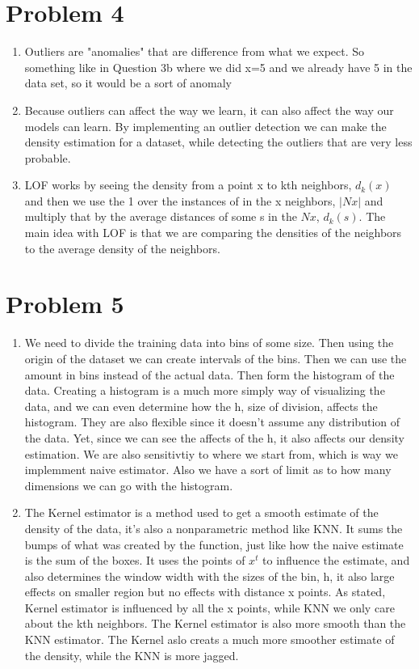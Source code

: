 \documentclass{article}
\begin{document}
\section*{Problem 4}
\begin{enumerate}[label=(\alph*)]
    \item Outliers are "anomalies" that are difference from what we expect. So something like in 
    Question 3b where we did x=5 and we already have 5 in the data set, so it would be a sort of anomaly
    \item Because outliers can affect the way we learn, it can also affect the way our models can learn. By implementing an outlier detection 
    we can make the density estimation for a dataset, while detecting the outliers that are very less probable. 
    \item LOF works by seeing the density from a point x to kth neighbors, $d_{k}(x)$ and then we use the 1 over the instances of in the x neighbors, $|N{x}|$ and multiply that by the average distances of some s in the $N{x}$, $d_{k}(s)$.
    The main idea with LOF is that we are comparing the densities of the neighbors to the average density of the neighbors.
\end{enumerate}
\section*{Problem 5}
\begin{enumerate}[label=(\alph*)]
    \item We need to divide the training data into bins of some size. Then using the origin of the dataset we can create intervals of the bins.
    Then we can use the amount in bins instead of the actual data. Then form the histogram of the data. Creating a histogram is a much more simply way of visualizing the data, and we can even determine how the h, size of division, affects 
    the histogram. They are also flexible since it doesn't assume any distribution of the data. Yet, since we can see the affects of the h, it also affects our density estimation. We are also sensitivtiy to where we start from, which is way we implemment naive estimator.
    Also we have a sort of limit as to how many dimensions we can go with the histogram. 
    \item The Kernel estimator is a method used to get a smooth estimate of the density of the data, it's also a nonparametric method like KNN. It sums the bumps of what was created by the function, just like how the naive estimate is the sum of the boxes. 
    It uses the points of $x^t$ to influence the estimate, and also determines the window width with the sizes of the bin, h, it also large effects on smaller region but no effects with distance x points. As stated, Kernel estimator is influenced by all the x points, while KNN we only care about the kth neighbors. The Kernel estimator is also more smooth than the KNN estimator. The Kernel aslo creats a much more smoother estimate of the density, while the KNN is more jagged. 
\end{enumerate}
\end{document}
